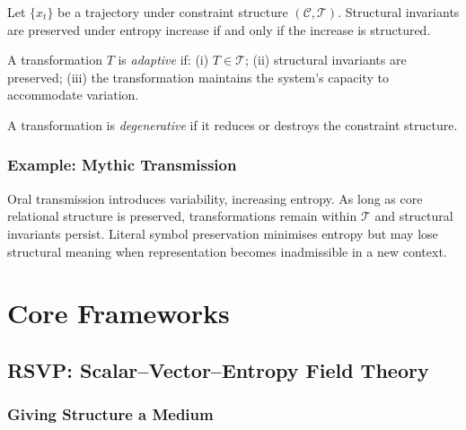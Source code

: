 \documentclass[11pt,openany]{book}
\begin{document}
\begin{theorem}
\label{thm:entropy}
Let $\{x_t\}$ be a trajectory under constraint structure
$(\mathcal{C}, \mathcal{T})$. Structural invariants are
preserved under entropy increase if and only if the
increase is structured.
\end{theorem}

\begin{definition}
\label{def:adaptive}
A transformation $T$ is \emph{adaptive} if: (i) $T \in
\mathcal{T}$; (ii) structural invariants are preserved;
(iii) the transformation maintains the system's capacity
to accommodate variation.
\end{definition}

\begin{definition}
\label{def:degenerative}
A transformation is \emph{degenerative} if it reduces or
destroys the constraint structure.
\end{definition}

\section{Example: Mythic Transmission}
\label{sec:myth}

Oral transmission introduces variability, increasing
entropy. As long as core relational structure is preserved,
transformations remain within $\mathcal{T}$ and structural
invariants persist. Literal symbol preservation minimises
entropy but may lose structural meaning when representation
becomes inadmissible in a new context.



\part{Core Frameworks}

\chapter[RSVP Field Theory]{RSVP: Scalar--Vector--Entropy Field Theory}
\label{ch:rsvp}

\section*{ Giving Structure a Medium}
\end{document}
